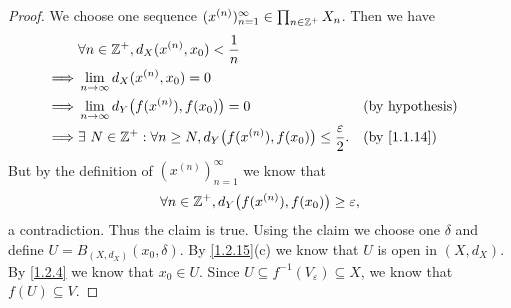 \begin{proof}
  We choose one sequence \((x^{(n)})_{n = 1}^\infty \in \prod_{n \in \mathbb{Z}^+} X_n\).
  Then we have
  \begin{align*}
             & \forall n \in \Z^+, d_X(x^{(n)}, x_0) < \dfrac{1}{n}                                                                                \\
    \implies & \lim_{n \to \infty} d_X(x^{(n)}, x_0) = 0                                                                                           \\
    \implies & \lim_{n \to \infty} d_Y\big(f(x^{(n)}), f(x_0)\big) = 0                                              &  & \text{(by hypothesis)}    \\
    \implies & \exists\ N \in \Z^+ : \forall n \geq N, d_Y\big(f(x^{(n)}), f(x_0)\big) \leq \dfrac{\varepsilon}{2}. &  & \text{(by \cref{1.1.14})}
  \end{align*}
  But by the definition of \((x^{(n)})_{n = 1}^\infty\) we know that
  \[
    \forall n \in \mathbb{Z}^+, d_Y\big(f(x^{(n)}), f(x_0)\big) \geq \varepsilon,
  \]
  a contradiction.
  Thus the claim is true.
  Using the claim we choose one \(\delta\) and define \(U = B_{(X, d_X)}(x_0, \delta)\).
  By \cref{1.2.15}(c) we know that \(U\) is open in \((X, d_X)\).
  By \cref{1.2.4} we know that \(x_0 \in U\).
  Since \(U \subseteq f^{-1}(V_\varepsilon) \subseteq X\), we know that \(f(U) \subseteq V\).


\end{proof}
